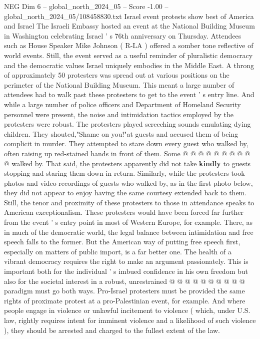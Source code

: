 \begin{textsample}{NEG Dim 6 – global\_north\_2024\_05 – Score -1.00 – global\_north\_2024\_05/108458830.txt}  \label{ex:f6_neg_288}
Israel event protests show best of America and Israel The Israeli Embassy hosted an event at the National Building Museum in Washington celebrating Israel ' s 76th anniversary on Thursday.
Attendees such as House Speaker Mike Johnson ( R-LA ) offered a somber tone reflective of world events.
Still, the event served as a useful reminder of pluralistic democracy and the democratic values Israel uniquely embodies in the Middle East.
A throng of approximately 50 protesters was spread out at various positions on the perimeter of the National Building Museum.
This meant a large number of attendees had to walk past these protesters to get to the event ' s entry line.
And while a large number of police officers and Department of Homeland Security personnel were present, the noise and intimidation tactics employed by the protesters were robust.
The protesters played screeching sounds emulating dying children.
They shouted,"Shame on you!"at guests and accused them of being complicit in murder.
They attempted to stare down every guest who walked by, often raising up red-stained hands in front of them.
Some @ @ @ @ @ @ @ @ @ @ walked by.
That said, the protesters apparently did not take \textbf{kindly} to guests stopping and staring them down in return.
Similarly, while the protesters took photos and video recordings of guests who walked by, as in the first photo below, they did not appear to enjoy having the same courtesy extended back to them.
Still, the tenor and proximity of these protesters to those in attendance speaks to American exceptionalism.
These protesters would have been forced far further from the event ' s entry point in most of Western Europe, for example.
There, as in much of the democratic world, the legal balance between intimidation and free speech falls to the former.
But the American way of putting free speech first, especially on matters of public import, is a far better one.
The health of a vibrant democracy requires the right to make an argument passionately.
This is important both for the individual ' s imbued confidence in his own freedom but also for the societal interest in a robust, unrestrained @ @ @ @ @ @ @ @ @ @ paradigm must go both ways.
Pro-Israel protesters must be provided the same rights of proximate protest at a pro-Palestinian event, for example.
And where people engage in violence or unlawful incitement to violence ( which, under U.S. law, rightly requires intent for imminent violence and a likelihood of such violence ), they should be arrested and charged to the fullest extent of the law.

\end{textsample}
